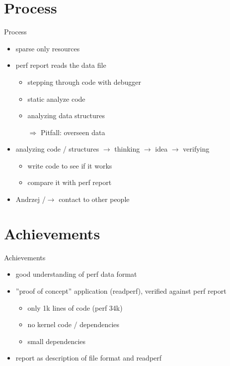 \section{Process}
\begin{frame}{Process}
\begin{itemize}
  \item sparse only resources
  \item perf report reads the data file
  \begin{itemize}
    \item stepping through code with debugger
    \item static analyze code
    \item analyzing data structures
    \item[$\Rightarrow$] Pitfall: overseen data
  \end{itemize}
  \item analyzing code / structures $\rightarrow$ thinking $\rightarrow$ idea $\rightarrow$ verifying
  \begin{itemize}
    \item write code to see if it works
    \item compare it with perf report
  \end{itemize}
  \item Andrzej /$\rightarrow$ contact to other people
\end{itemize}
\end{frame}

\section{Achievements}
\begin{frame}{Achievements}
\begin{itemize}
  \item good understanding of perf data format
  \item ''proof of concept'' application (readperf), verified against perf report
  \begin{itemize}
    \item only 1k lines of code (perf 34k)
    \item no kernel code / dependencies
    \item small dependencies
  \end{itemize}
  \item report as description of file format and readperf
\end{itemize}
\end{frame}

